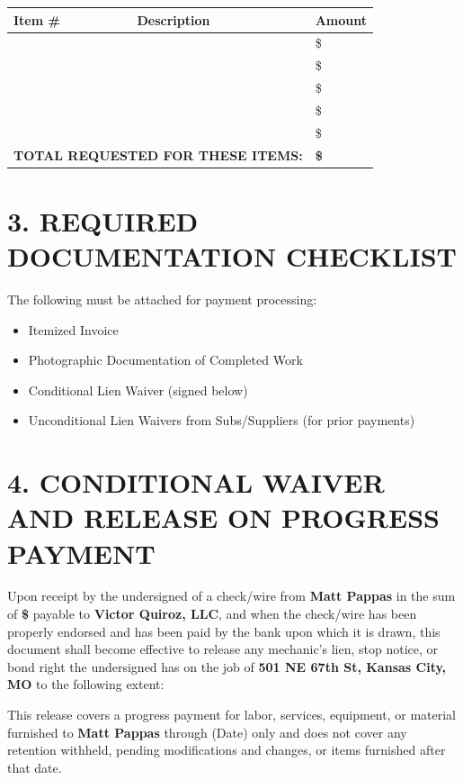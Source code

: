 \documentclass[10pt,letterpaper]{article}
\begin{document}
\begin{tabularx}{\textwidth}{|l|X|l|}
\hline
\textbf{Item \#} & \textbf{Description} & \textbf{Amount} \\
\hline
\hspace{1cm} & & \$ \\
\hline
\hspace{1cm} & & \$ \\
\hline
\hspace{1cm} & & \$ \\
\hline
\hspace{1cm} & & \$ \\
\hline
\hspace{1cm} & & \$ \\
\hline
\multicolumn{2}{|r|}{\textbf{TOTAL REQUESTED FOR THESE ITEMS:}} & \textbf{\$} \\
\hline
\end{tabularx}

\section*{3. REQUIRED DOCUMENTATION CHECKLIST}
The following must be attached for payment processing:
\begin{itemize}
\item[$\square$] Itemized Invoice
\item[$\square$] Photographic Documentation of Completed Work
\item[$\square$] Conditional Lien Waiver (signed below)
\item[$\square$] Unconditional Lien Waivers from Subs/Suppliers (for prior payments)
\end{itemize}

\section*{4. CONDITIONAL WAIVER AND RELEASE ON PROGRESS PAYMENT}
Upon receipt by the undersigned of a check/wire from \textbf{Matt Pappas} in the sum of \textbf{\$\underline{\hspace{3cm}}} payable to \textbf{Victor Quiroz, LLC}, and when the check/wire has been properly endorsed and has been paid by the bank upon which it is drawn, this document shall become effective to release any mechanic's lien, stop notice, or bond right the undersigned has on the job of \textbf{501 NE 67th St, Kansas City, MO} to the following extent:

This release covers a progress payment for labor, services, equipment, or material furnished to \textbf{Matt Pappas} through \textbf{\underline{\hspace{3cm}}} (Date) only and does not cover any retention withheld, pending modifications and changes, or items furnished after that date.
\end{document}
